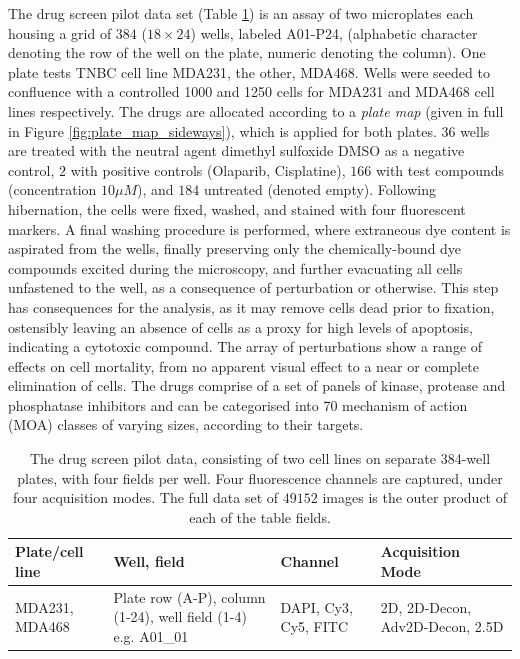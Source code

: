 The drug screen pilot data set (Table \ref{table:drugscreen}) is an assay of two microplates each housing a grid of $384$ ($18 \times 24$) wells, labeled A01-P24, (alphabetic character denoting the row of the well on the plate, numeric denoting the column). One plate tests TNBC cell line MDA231, the other, MDA468. Wells were seeded to confluence with a controlled 1000 and 1250 cells for MDA231 and MDA468 cell lines respectively. The drugs are allocated according to a \emph{plate map} (given in full in Figure \ref{fig:plate_map_sideways}), which is applied for both plates. $36$ wells are treated with the neutral agent dimethyl sulfoxide DMSO as a negative control, $2$ with positive controls (Olaparib, Cisplatine), $166$ with test compounds (concentration $10\mu M$), and $184$ untreated (denoted empty). Following hibernation, the cells were fixed, washed, and stained with four fluorescent markers. A final washing procedure is performed, where extraneous dye content is aspirated from the wells, finally preserving only the chemically-bound dye compounds excited during the microscopy, and further evacuating all cells unfastened to the well, as a consequence of perturbation or otherwise. This step has consequences for the analysis, as it may remove cells dead prior to fixation, ostensibly leaving an absence of cells as a proxy for high levels of apoptosis, indicating a cytotoxic compound. The array of perturbations show a range of effects on cell mortality, from no apparent visual effect to a near or complete elimination of cells. The drugs comprise of a set of panels of kinase, protease and phosphatase inhibitors and can be categorised into 70 mechanism of action (MOA) classes of varying sizes, according to their targets.

\begin{table}
\begin{center}
\begin{tabular}{|p{2.5cm}|p{3cm}|p{2.5cm}|p{3cm}|}
\hline
Plate/cell line & Well, field & Channel & Acquisition Mode \\
\hline
MDA231, MDA468 & Plate row (A-P), column (1-24), well field (1-4) e.g. A01\_01 & DAPI, Cy3, Cy5, FITC & 2D, 2D-Decon, Adv2D-Decon, 2.5D \\
\hline
\end{tabular}
\caption{The drug screen pilot data, consisting of two cell lines on separate 384-well plates, with four fields per well. Four fluorescence channels are captured, under four acquisition modes. The full data set of $49152$ images is the outer product of each of the table fields.}
\label{table:drugscreen}
\end{center}
\end{table}

